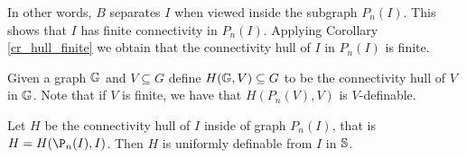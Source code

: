 In other words, $B$ separates $I$ when viewed inside the subgraph $P_n(I)$.
This shows that $I$ has finite connectivity in $P_n(I)$.
Applying Corollary \ref{cr_hull_finite} we obtain that the connectivity hull of $I$ in $P_n(I)$ is finite.


\begin{Definition}
  Given a graph $\mathbb G$ and $V \subseteq G$ define $H(\mathbb G, V) \subseteq G$ to be the connectivity hull of $V$ in $\mathbb G$.
  Note that if $V$ is finite, we have that $H(P_n(V), V)$ is $V$-definable.
\end{Definition}

\begin{Lemma} \label{lm_uniform}
  Let $H$ be the connectivity hull of $I$ inside of graph $P_n(I)$, that is $H = H(\P_n(I), I)$.
  Then $H$ is uniformly definable from $I$ in $\mathbb S$.
\end{Lemma}


